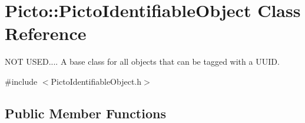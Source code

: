 \hypertarget{class_picto_1_1_picto_identifiable_object}{\section{Picto\-:\-:Picto\-Identifiable\-Object Class Reference}
\label{class_picto_1_1_picto_identifiable_object}
}


N\-O\-T U\-S\-E\-D.... A base class for all objects that can be tagged with a U\-U\-I\-D.  




{\ttfamily \#include $<$Picto\-Identifiable\-Object.\-h$>$}

\subsection*{Public Member Functions}
